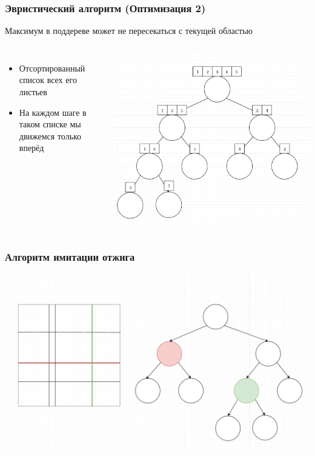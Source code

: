 \documentclass{beamer}
\begin{document}
\begin{frame}
    \frametitle{Эвристический алгоритм (Оптимизация 2)}
    Максимум в поддереве может не пересекаться с текущей областью
             
    \begin{columns}
            \begin{itemize}
                \item Отсортированный список всех его листьев
                \item На каждом шаге в таком списке мы движемся только вперёд
            \end{itemize}
            \includegraphics[width=1.1\textwidth]{merge.png}
    \end{columns}
\end{frame}

\begin{frame}
\frametitle{Алгоритм имитации отжига}
    \begin{center}
    \includegraphics[width=\textwidth]{gena.png}
    \end{center}
\end{frame}
\end{document}
